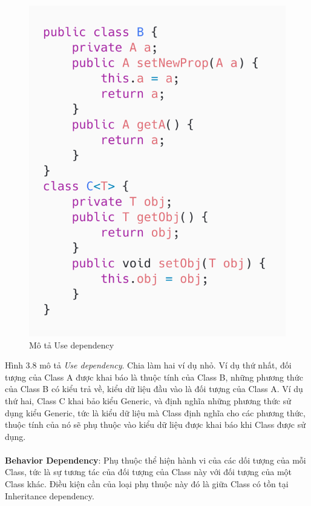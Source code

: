 \documentclass[12pt]{report}
\begin{document}
\begin{figure}[!htbp]
	\centering
	\includegraphics[scale=0.5]{images/use_dependency}
	\caption{Mô tả Use dependency}
	\label{fig:}
\end{figure}
\noindent Hình 3.8 mô tả \textit{Use dependency}. Chia làm hai ví dụ nhỏ. Ví dụ thứ nhất, đối tượng của Class A được khai báo là thuộc tính của Class B, những phương thức của Class B có kiểu trả về, kiểu dữ liệu đầu vào là đối tượng của Class A. Ví dụ thứ hai, Class C khai bảo kiểu Generic, và định nghĩa những phương thức sử dụng kiểu Generic, tức là kiểu dữ liệu mà Class định nghĩa cho các phương thức, thuộc tính của nó sẽ phụ thuộc vào kiểu dữ liệu được khai báo khi Class được sử dụng.
\\\\

\noindent \textbf{Behavior Dependency}: Phụ thuộc thể hiện hành vi của các dối tượng của mỗi Class, tức là sự tương tác của đối tượng của Class này với đối tượng của một Class khác. Điều kiện cần của loại phụ thuộc này đó là giữa Class có tồn tại Inheritance dependency.
\end{document}
